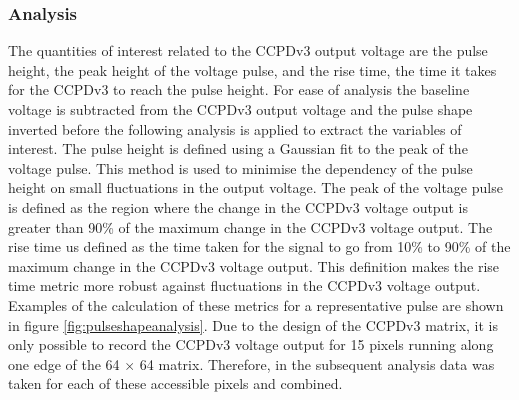 
\subsubsection{Analysis}
The quantities of interest related to the CCPDv3 output voltage are the pulse height, the peak height of the voltage pulse, and the rise time, the time it takes for the CCPDv3 to reach the pulse height.  For ease of analysis the baseline voltage is subtracted from the CCPDv3 output voltage and the pulse shape inverted before the following analysis is applied to extract the variables of interest.  The pulse height is defined using a Gaussian fit to the peak of the voltage pulse.  This method is used to minimise the dependency of the pulse height on small fluctuations in the output voltage.  The peak of the voltage pulse is defined as the region where the change in the CCPDv3 voltage output is greater than 90\% of the maximum change in the CCPDv3 voltage output.  The rise time us defined as the time taken for the signal to go from 10\% to 90\% of the maximum change in the CCPDv3 voltage output.  This definition makes the rise time metric more robust against fluctuations in the CCPDv3 voltage output.  Examples of the calculation of these metrics for a representative pulse are shown in figure \ref{fig:pulseshapeanalysis}.  Due to the design of the CCPDv3 matrix, it is only possible to record the CCPDv3 voltage output for 15 pixels running along one edge of the 64 $\times$ 64 matrix.  Therefore, in the subsequent analysis data was taken for each of these accessible pixels and combined.

